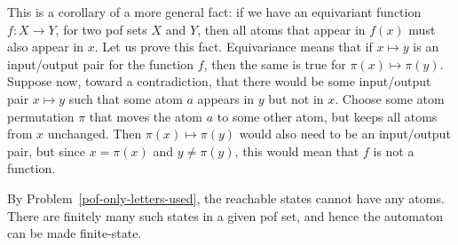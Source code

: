     {This is a corollary of a more general fact: if we have an equivariant function $f : X \to Y$, for two pof sets $X$ and $Y$, then all atoms that appear in $f(x)$ must also appear in $x$. Let us prove this fact. Equivariance means that if $x \mapsto y$ is an input/output pair for the function $f$, then the same is true for $\pi(x) \mapsto \pi(y)$. Suppose now, toward a contradiction, that there would be some input/output pair $x \mapsto y$ such that some atom $a$ appears in $y$ but not in $x$. Choose some atom permutation $\pi$ that moves the atom $a$ to some other atom, but keeps all atoms from $x$ unchanged. Then $\pi(x) \mapsto \pi(y)$ would also need to be an input/output pair, but since $x=\pi(x)$ and $y \neq \pi(y)$, this would mean that $f$ is not a function. } 

    {
        By Problem~\ref{pof-only-letters-used}, the reachable states cannot have any atoms. There are finitely many such states in a given pof set, and hence the automaton can be made finite-state.  
    }

